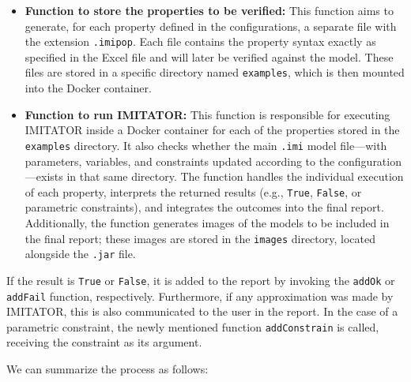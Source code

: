 \begin{itemize}
    \item \textbf{Function to store the properties to be verified:} This function aims to generate, for each property defined in the configurations, a separate file with the extension \texttt{.imipop}. Each file contains the property syntax exactly as specified in the Excel file and will later be verified against the model. These files are stored in a specific directory named \texttt{examples}, which is then mounted into the Docker container.

    \item \textbf{Function to run IMITATOR:} This function is responsible for executing IMITATOR inside a Docker container for each of the properties stored in the \texttt{examples} directory. It also checks whether the main \texttt{.imi} model file—with parameters, variables, and constraints updated according to the configuration—exists in that same directory. The function handles the individual execution of each property, interprets the returned results (e.g., \texttt{True}, \texttt{False}, or parametric constraints), and integrates the outcomes into the final report. Additionally, the function generates images of the models to be included in the final report; these images are stored in the \texttt{images} directory, located alongside the \texttt{.jar} file.
\end{itemize}

If the result is \texttt{True} or \texttt{False}, it is added to the report by invoking the \texttt{addOk} or \texttt{addFail} function, respectively. Furthermore, if any approximation was made by IMITATOR, this is also communicated to the user in the report. In the case of a parametric constraint, the newly mentioned function \texttt{addConstrain} is called, receiving the constraint as its argument.

We can summarize the process as follows:

